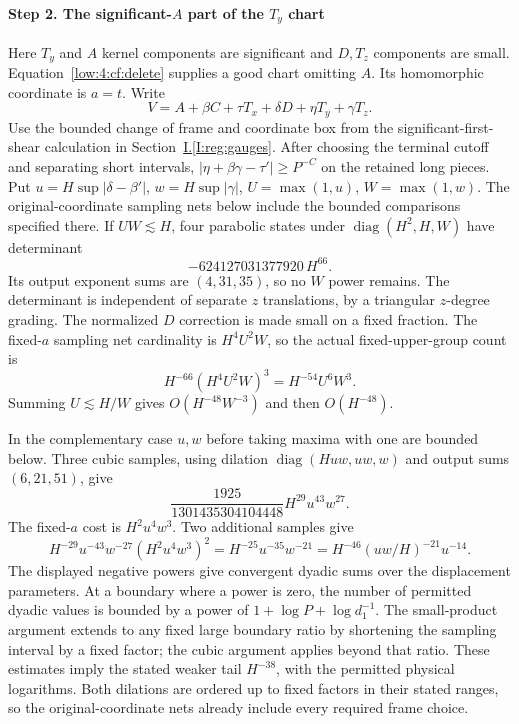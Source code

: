 \documentclass[11pt]{amsart}
\theoremstyle{definition}
\theoremstyle{remark}
\newcommand{\abs}[1]{\lvert #1\rvert}
\DeclareMathOperator{\diag}{diag}
\numberwithin{equation}{section}
\newcommand{\partIref}[1]{\hyperref[I:#1]{I.\ref*{I:#1}}}
\begin{document}
\paragraph{Step 2. \texorpdfstring{The significant-$A$ part of the $T_y$ chart}{The significant-A part of the Ty chart}}
Here $T_y$ and $A$ kernel components are significant and $D,T_z$ components are small. Equation~\eqref{low:4:cf:delete} supplies a good chart omitting $A$. Its homomorphic coordinate is $a=t$. Write
\[
V=A+\beta C+\tau T_x+\delta D+\eta T_y+\gamma T_z.
\]
Use the bounded change of frame and coordinate box from the significant-first-shear calculation in Section~\partIref{reg:gauges}. After choosing the terminal cutoff and separating short intervals, $|\eta+\beta\gamma-\tau'|\ge P^{-C}$ on the retained long pieces. Put $u=H\sup\abs{\delta-\beta'}$, $w=H\sup\abs\gamma$, $U=\max(1,u)$, $W=\max(1,w)$. The original-coordinate sampling nets below include the bounded comparisons specified there.
If $UW\lesssim H$, four parabolic states under $\diag(H^2,H,W)$ have determinant
\[
-624127031377920\,H^{66}.
\]
Its output exponent sums are $(4,31,35)$, so no $W$ power remains. The determinant is independent of separate $z$ translations, by a triangular $z$-degree grading. The normalized $D$ correction is made small on a fixed fraction. The fixed-$a$ sampling net cardinality is $H^4U^2W$, so the actual fixed-upper-group count is
\[
H^{-66}(H^4U^2W)^3=H^{-54}U^6W^3.
\]
Summing $U\lesssim H/W$ gives $O(H^{-48}W^{-3})$ and then $O(H^{-48})$.

In the complementary case $u,w$ before taking maxima with one are bounded below. Three cubic samples, using dilation $\diag(Huw,uw,w)$ and output sums $(6,21,51)$, give
\[
\frac{1925}{1301435304104448}H^{29}u^{43}w^{27}.
\]
The fixed-$a$ cost is $H^2u^4w^3$. Two additional samples give
\[
H^{-29}u^{-43}w^{-27}(H^2u^4w^3)^2
=H^{-25}u^{-35}w^{-21}
=H^{-46}(uw/H)^{-21}u^{-14}.
\]
The displayed negative powers give convergent dyadic sums over the displacement parameters. At a boundary where a power is zero, the number of permitted dyadic values is bounded by a power of $1+\log P+\log d_1^{-1}$. The small-product argument extends to any fixed large boundary ratio by shortening the sampling interval by a fixed factor; the cubic argument applies beyond that ratio. These estimates imply the stated weaker tail $H^{-38}$, with the permitted physical logarithms. Both dilations are ordered up to fixed factors in their stated ranges, so the original-coordinate nets already include every required frame choice.
\end{document}
